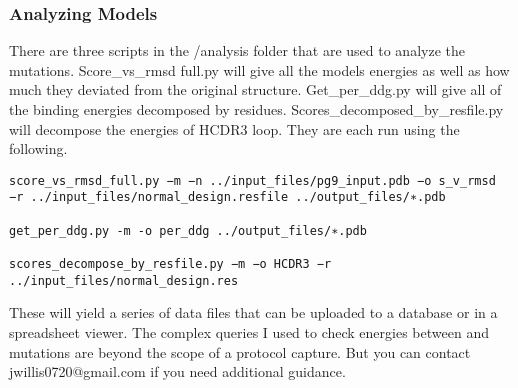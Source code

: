 \subsubsection{Analyzing Models}
There are three scripts in the /analysis folder that are used to analyze the mutations. Score\_vs\_rmsd full.py will give all the models energies as well as how much they deviated from the original structure. Get\_per\_ddg.py will give all of the binding energies decomposed by residues. Scores\_decomposed\_by\_resfile.py will decompose the energies of HCDR3 loop. They are each run using the following.

\begin{lstlisting}[breaklines=true]
score_vs_rmsd_full.py −m −n ../input_files/pg9_input.pdb −o s_v_rmsd −r ../input_files/normal_design.resfile ../output_files/∗.pdb

get_per_ddg.py -m -o per_ddg ../output_files/∗.pdb

scores_decompose_by_resfile.py −m −o HCDR3 −r ../input_files/normal_design.res
\end{lstlisting}

These will yield a series of data files that can be uploaded to a database or in a spreadsheet viewer. The complex queries I used to check energies between  and mutations are beyond the scope of a protocol capture. But you can contact jwillis0720@gmail.com if you need additional guidance.




